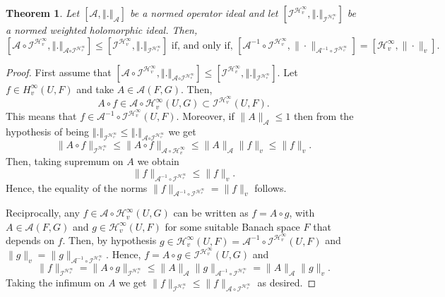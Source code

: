 \documentclass[12pt]{amsart}
\newtheorem{theorem}{Theorem}[section]
\theoremstyle{plain}
\numberwithin{equation}{section}
\begin{document}
\begin{theorem}\label{caract}
Let $\left[ \mathcal{A},\left\Vert .\right\Vert _{\mathcal{A}}%
\right] $ be a normed operator ideal and let $\left[ \mathcal{I}^{\mathcal{H}%
_{v}^{\infty }},\left\Vert .\right\Vert _{\mathcal{I}^{\mathcal{H}%
_{v}^{\infty }}}\right] $ be a normed weighted holomorphic ideal. Then, 
$$
\left[ \mathcal{A}\circ\mathcal{ I}^{\mathcal{H}_{v}^{\infty
}},\left\Vert .\right\Vert _{\mathcal{A}\mathcal{\circ I}^{\mathcal{H}%
_{v}^{\infty }}}\right] \leq \left[\mathcal I^{ \mathcal{H}_{v}^{\infty }},\left\Vert
.\right\Vert _{\mathcal I^{\mathcal{H}_{v}^{\infty }}}\right] 
\mbox{ if, and only if, }\left[\mathcal A^{-1}\circ \mathcal I^{\mathcal H_v^\infty}, \|\cdot \|_{\mathcal A^{-1}\circ \mathcal I^{\mathcal H_v^\infty}}\right]=\left[\mathcal H_v^\infty,\|\cdot\|_v\right].$$
\end{theorem}

\begin{proof}
First assume that $ \left[ \mathcal{A}\circ\mathcal{ I}^{\mathcal{H}_{v}^{\infty
}},\left\Vert .\right\Vert _{\mathcal{A}\mathcal{\circ I}^{\mathcal{H}%
_{v}^{\infty }}}\right] \leq \left[\mathcal I^{ \mathcal{H}_{v}^{\infty }},\left\Vert
.\right\Vert _{\mathcal I^{\mathcal{H}_{v}^{\infty }}}\right]$. Let $f\in H_v^\infty (U,F)$ and take $A\in \mathcal A(F,G)$. Then, 
$$
A\circ f\in \mathcal A\circ \mathcal H_v^\infty(U,G)\subset \mathcal I^{ \mathcal{H}_{v}^{\infty }}(U,F).
$$
This means that $f\in \mathcal A^{-1}\circ \mathcal I^{\mathcal H_v^\infty}(U,F)$. Moreover, if $\|A\|_{\mathcal A}\leq 1$ then from the hypothesis of being $\left\Vert
.\right\Vert _{\mathcal I^{\mathcal{H}_{v}^{\infty }}}\leq \left\Vert .\right\Vert _{\mathcal{A}\mathcal{\circ I}^{\mathcal{H}%
_{v}^{\infty }}}$ we get
$$
\|A\circ f\|_{\mathcal I^{\mathcal H_v^\infty}}\leq \| A\circ f\|_{\mathcal A\circ \mathcal H_v^\infty}\leq \| A\|_{\mathcal A}\| f\|_v\leq \| f\|_v.
$$
Then, taking supremum on $A$ we obtain
$$
\|f\|_{\mathcal A^{-1}\circ \mathcal I^{\mathcal H_v^\infty}}\leq \|f\|_v.
$$
Hence, the equality of the norms $\|f\|_{\mathcal A^{-1}\circ \mathcal I^{\mathcal H_v^\infty}}= \|f\|_v$ follows.


Reciprocally, any $f\in \mathcal A\circ \mathcal H_v^\infty(U,G)$ can be written as $f=A\circ g$, with $A\in \mathcal A(F,G)$ and $g\in \mathcal H_v^\infty (U,F)$ for some suitable Banach space $F$ that depends on $f$. Then, by hypothesis $g\in  \mathcal H_v^\infty (U,F)=\mathcal A^{-1}\circ \mathcal I^{\mathcal H_v^\infty}(U,F)$ and $\|g\|_v=\|g\|_{\mathcal A^{-1}\circ \mathcal I^{\mathcal H_v^\infty}}$. Hence, $f=A\circ g\in \mathcal{ I}^{\mathcal{H}_{v}^{\infty
}}(U,G)$ and 
$$
\|f\|_{\mathcal I^{\mathcal H_v^\infty}}=\|A\circ g\|_{\mathcal I^{\mathcal H_v^\infty}}\leq \|A\|_{\mathcal A}\|g\|_{\mathcal A^{-1}\circ \mathcal I^{\mathcal H_v^\infty}}=\|A\|_{\mathcal A}\|g\|_v.
$$
Taking the infimum on $A$ we get $\|f\|_{\mathcal I^{\mathcal H_v^\infty}}\leq \| f\|_{\mathcal A\circ \mathcal I^{\mathcal H_v^\infty}}$ as desired.
\end{proof}
\end{document}

